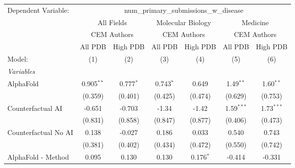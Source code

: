 \begingroup
\centering
\begin{tabular}{lcccccc}
   \tabularnewline \midrule \midrule
   Dependent Variable: & \multicolumn{6}{c}{num\_primary\_submissions\_w\_disease}\\
 & \multicolumn{2}{c}{All Fields} & \multicolumn{2}{c}{Molecular Biology} & \multicolumn{2}{c}{Medicine} \\
\cmidrule(lr){2-3} \cmidrule(lr){4-5} \cmidrule(lr){6-7}
 & \multicolumn{2}{c}{CEM Authors} & \multicolumn{2}{c}{CEM Authors} & \multicolumn{2}{c}{CEM Authors} \\
\cmidrule(lr){2-3} \cmidrule(lr){4-5} \cmidrule(lr){6-7}
 & \multicolumn{1}{c}{All PDB} & \multicolumn{1}{c}{High PDB} & \multicolumn{1}{c}{All PDB} & \multicolumn{1}{c}{High PDB} & \multicolumn{1}{c}{All PDB} & \multicolumn{1}{c}{High PDB} \\
\cmidrule(lr){2-2} \cmidrule(lr){3-3} \cmidrule(lr){4-4} \cmidrule(lr){5-5} \cmidrule(lr){6-6} \cmidrule(lr){7-7}
   Model:                                                     & (1)           & (2)           & (3)           & (4)           & (5)           & (6)\\  
   \midrule
   \emph{Variables}\\
   AlphaFold                                                  & 0.905$^{**}$  & 0.777$^{*}$   & 0.743$^{*}$   & 0.649         & 1.49$^{**}$   & 1.60$^{**}$\\   
                                                              & (0.359)       & (0.401)       & (0.425)       & (0.474)       & (0.629)       & (0.753)\\   
   Counterfactual AI                                          & -0.651        & -0.703        & -1.34         & -1.42         & 1.59$^{***}$  & 1.73$^{***}$\\   
                                                              & (0.831)       & (0.858)       & (0.847)       & (0.877)       & (0.406)       & (0.473)\\   
   Counterfactual No AI                                       & 0.138         & -0.027        & 0.186         & 0.033         & 0.540         & 0.743\\   
                                                              & (0.381)       & (0.402)       & (0.434)       & (0.472)       & (0.550)       & (0.742)\\   
   AlphaFold - Method                                         & 0.095         & 0.130         & 0.130         & 0.176$^{*}$   & -0.414        & -0.331\\   

\end{tabular}
